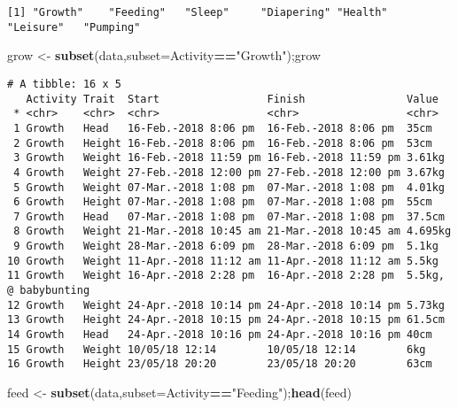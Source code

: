 \documentclass[10,portrait]{article}
\newenvironment{Shaded}{\begin{snugshade}}{\end{snugshade}}
\newcommand{\KeywordTok}[1]{\textcolor[rgb]{0.13,0.29,0.53}{\textbf{#1}}}
\newcommand{\DataTypeTok}[1]{\textcolor[rgb]{0.13,0.29,0.53}{#1}}
\newcommand{\StringTok}[1]{\textcolor[rgb]{0.31,0.60,0.02}{#1}}
\newcommand{\OperatorTok}[1]{\textcolor[rgb]{0.81,0.36,0.00}{\textbf{#1}}}
\newcommand{\NormalTok}[1]{#1}
\begin{document}
\begin{verbatim}
[1] "Growth"    "Feeding"   "Sleep"     "Diapering" "Health"    "Leisure"   "Pumping"  
\end{verbatim}

\begin{Shaded}
\begin{Highlighting}[]
\NormalTok{grow <-}\StringTok{ }\KeywordTok{subset}\NormalTok{(data,}\DataTypeTok{subset=}\NormalTok{Activity}\OperatorTok{==}\StringTok{"Growth"}\NormalTok{);grow}
\end{Highlighting}
\end{Shaded}

\begin{verbatim}
# A tibble: 16 x 5
   Activity Trait  Start                 Finish                Value               
 * <chr>    <chr>  <chr>                 <chr>                 <chr>               
 1 Growth   Head   16-Feb.-2018 8:06 pm  16-Feb.-2018 8:06 pm  35cm                
 2 Growth   Height 16-Feb.-2018 8:06 pm  16-Feb.-2018 8:06 pm  53cm                
 3 Growth   Weight 16-Feb.-2018 11:59 pm 16-Feb.-2018 11:59 pm 3.61kg              
 4 Growth   Weight 27-Feb.-2018 12:00 pm 27-Feb.-2018 12:00 pm 3.67kg              
 5 Growth   Weight 07-Mar.-2018 1:08 pm  07-Mar.-2018 1:08 pm  4.01kg              
 6 Growth   Height 07-Mar.-2018 1:08 pm  07-Mar.-2018 1:08 pm  55cm                
 7 Growth   Head   07-Mar.-2018 1:08 pm  07-Mar.-2018 1:08 pm  37.5cm              
 8 Growth   Weight 21-Mar.-2018 10:45 am 21-Mar.-2018 10:45 am 4.695kg             
 9 Growth   Weight 28-Mar.-2018 6:09 pm  28-Mar.-2018 6:09 pm  5.1kg               
10 Growth   Weight 11-Apr.-2018 11:12 am 11-Apr.-2018 11:12 am 5.5kg               
11 Growth   Weight 16-Apr.-2018 2:28 pm  16-Apr.-2018 2:28 pm  5.5kg, @ babybunting
12 Growth   Weight 24-Apr.-2018 10:14 pm 24-Apr.-2018 10:14 pm 5.73kg              
13 Growth   Height 24-Apr.-2018 10:15 pm 24-Apr.-2018 10:15 pm 61.5cm              
14 Growth   Head   24-Apr.-2018 10:16 pm 24-Apr.-2018 10:16 pm 40cm                
15 Growth   Weight 10/05/18 12:14        10/05/18 12:14        6kg                 
16 Growth   Height 23/05/18 20:20        23/05/18 20:20        63cm                
\end{verbatim}

\begin{Shaded}
\begin{Highlighting}[]
\NormalTok{feed <-}\StringTok{ }\KeywordTok{subset}\NormalTok{(data,}\DataTypeTok{subset=}\NormalTok{Activity}\OperatorTok{==}\StringTok{"Feeding"}\NormalTok{);}\KeywordTok{head}\NormalTok{(feed)}
\end{Highlighting}
\end{Shaded}
\end{document}
